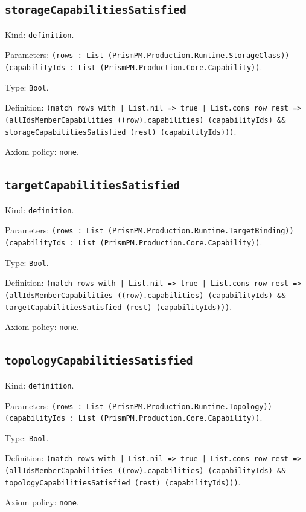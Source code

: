 \documentclass[11pt]{article}
\begin{document}
\subsection*{\texttt{storageCapabilitiesSatisfied}}
\noindent Kind: \texttt{definition}.\par
\noindent Parameters: \texttt{(rows : List (PrismPM.Production.Runtime.StorageClass)) (capabilityIds : List (PrismPM.Production.Core.Capability))}.\par
\noindent Type: \texttt{Bool}.\par
\noindent Definition: \texttt{(match rows with | List.nil => true | List.cons row rest => (allIdsMemberCapabilities ((row).capabilities) (capabilityIds) \&\& storageCapabilitiesSatisfied (rest) (capabilityIds)))}.\par
\noindent Axiom policy: \texttt{none}.\par
\subsection*{\texttt{targetCapabilitiesSatisfied}}
\noindent Kind: \texttt{definition}.\par
\noindent Parameters: \texttt{(rows : List (PrismPM.Production.Runtime.TargetBinding)) (capabilityIds : List (PrismPM.Production.Core.Capability))}.\par
\noindent Type: \texttt{Bool}.\par
\noindent Definition: \texttt{(match rows with | List.nil => true | List.cons row rest => (allIdsMemberCapabilities ((row).capabilities) (capabilityIds) \&\& targetCapabilitiesSatisfied (rest) (capabilityIds)))}.\par
\noindent Axiom policy: \texttt{none}.\par
\subsection*{\texttt{topologyCapabilitiesSatisfied}}
\noindent Kind: \texttt{definition}.\par
\noindent Parameters: \texttt{(rows : List (PrismPM.Production.Runtime.Topology)) (capabilityIds : List (PrismPM.Production.Core.Capability))}.\par
\noindent Type: \texttt{Bool}.\par
\noindent Definition: \texttt{(match rows with | List.nil => true | List.cons row rest => (allIdsMemberCapabilities ((row).capabilities) (capabilityIds) \&\& topologyCapabilitiesSatisfied (rest) (capabilityIds)))}.\par
\noindent Axiom policy: \texttt{none}.\par
\end{document}
